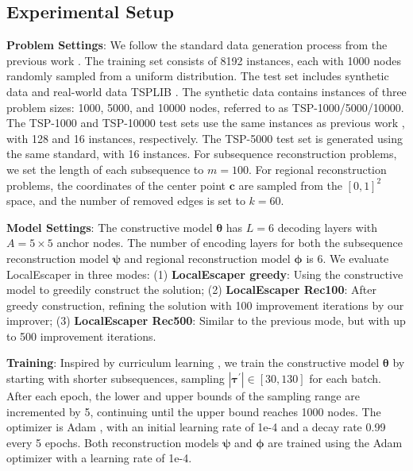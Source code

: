 \label{08Tab_random}

\subsection{Experimental Setup}
\textbf{Problem Settings}: We follow the standard data generation process from the previous work \cite{kool2018attention}. 
The training set consists of 8192 instances, each with 1000 nodes randomly sampled from a uniform distribution. 
The test set includes synthetic data and real-world data TSPLIB \cite{reinelt1991tsplib}. 
The synthetic data contains instances of three problem sizes: 1000, 5000, and 10000 nodes, referred to as TSP-1000/5000/10000. 
The TSP-1000 and TSP-10000 test sets use the same instances as previous work \cite{fu2021generalize}, with 128 and 16 instances, respectively. The TSP-5000 test set is generated using the same standard, with 16 instances. 
For subsequence reconstruction problems, we set the length of each subsequence to $m=100$. For regional reconstruction problems, the coordinates of the center point $\boldsymbol{c}$ are sampled from the $[0,1]^2$ space, and the number of removed edges is set to $k=60$. 

\textbf{Model Settings}: The constructive model $\boldsymbol{\theta}$ has $L=6$ decoding layers with $A = 5 \times 5$ anchor nodes. The number of encoding layers for both the subsequence reconstruction model $\boldsymbol{\psi}$ and regional reconstruction model $\boldsymbol{\phi}$ is 6. 
We evaluate LocalEscaper in three modes: (1) \textbf{LocalEscaper greedy}: Using the constructive model to greedily construct the solution; (2) \textbf{LocalEscaper Rec100}: After greedy construction, refining the solution with 100 improvement iterations by our improver; (3) \textbf{LocalEscaper Rec500}: Similar to the previous mode, but with up to 500 improvement iterations.

\textbf{Training}: Inspired by curriculum learning \cite{wang2021survey}, we train the constructive model $\boldsymbol{\theta}$ by starting with shorter subsequences, sampling $|\boldsymbol{\tau}^{\prime}| \in [30,130]$ for each batch. After each epoch, the lower and upper bounds of the sampling range are incremented by 5, continuing until the upper bound reaches 1000 nodes. The optimizer is Adam \cite{kingma2014adam}, with an initial learning rate of 1e-4 and a decay rate 0.99 every 5 epochs. Both reconstruction models $\boldsymbol{\psi}$ and $\boldsymbol{\phi}$ are trained using the Adam optimizer with a learning rate of 1e-4. 

